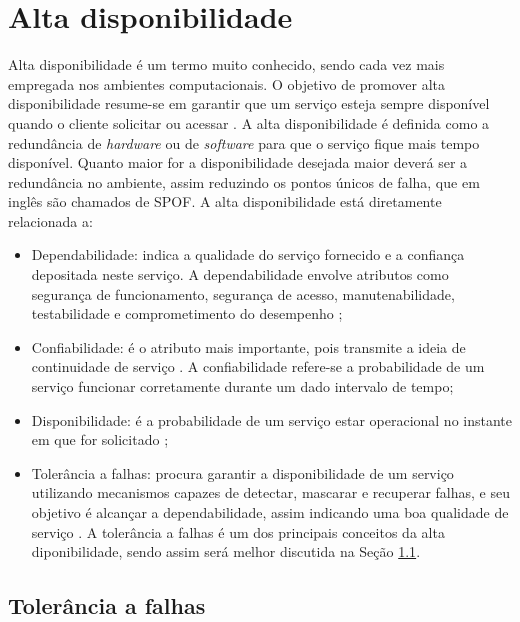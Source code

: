 \chapter{Alta disponibilidade}
\label{cap:altadiponibilidade}

Alta disponibilidade é um termo muito conhecido, sendo cada vez mais empregada nos ambientes computacionais. O objetivo de promover 
alta disponibilidade resume-se em garantir que um serviço esteja sempre disponível quando o cliente solicitar ou acessar \cite{costa2009}.
A alta disponibilidade é definida como a redundância de \textit{hardware} ou de \textit{software} para que o serviço fique mais tempo disponível.
Quanto maior for a disponibilidade desejada maior deverá ser a redundância no ambiente, assim reduzindo os pontos únicos de falha,
que em inglês são chamados de \ac{SPOF}. A alta disponibilidade está diretamente relacionada a: 
\begin{itemize}
 \item Dependabilidade: indica a qualidade do serviço fornecido e a confiança depositada neste serviço. A dependabilidade envolve atributos 
 como segurança de funcionamento, segurança de acesso, manutenabilidade, testabilidade e comprometimento do desempenho \cite{weber2002};
 \item Confiabilidade: é o atributo mais importante, pois transmite a ideia de continuidade de serviço \cite{pankaj1994}. A confiabilidade 
 refere-se a probabilidade de um serviço funcionar corretamente durante um dado intervalo de tempo;
 \item Disponibilidade: é a probabilidade de um serviço estar operacional no instante em que for solicitado \cite{costa2009};
 \item Tolerância a falhas: procura garantir a disponibilidade de um serviço utilizando mecanismos capazes de detectar, mascarar e recuperar 
 falhas, e seu objetivo é alcançar a dependabilidade, assim indicando uma boa qualidade de serviço \cite{costa2009}. A tolerância a falhas é 
 um dos principais conceitos da alta diponibilidade, sendo assim será melhor discutida na Seção \ref{section:toleranciafalhas}.
\end{itemize}

\section{Tolerância a falhas}
\label{section:toleranciafalhas}

